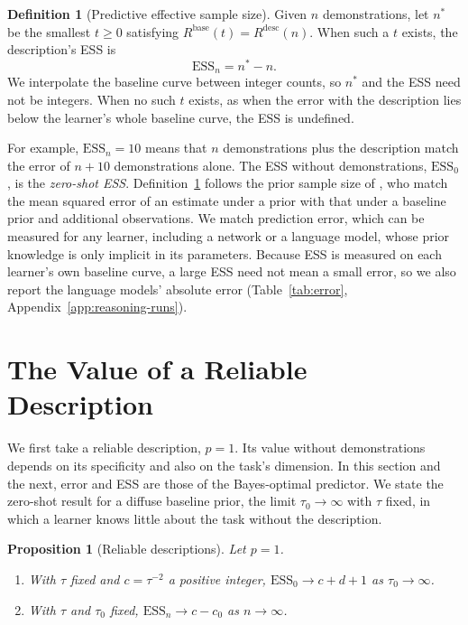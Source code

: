\documentclass{article}
\newtheorem{proposition}[theorem]{Proposition}
\theoremstyle{definition}
\newtheorem{definition}{Definition}
\newcommand{\ess}{\mathrm{ESS}}
\begin{document}
\begin{definition}[Predictive effective sample size]\label{def:ess}
Given $n$ demonstrations, let $n^*$ be the smallest $t\geq0$ satisfying $R^{\mathrm{base}}(t)=R^{\mathrm{desc}}(n)$. When such a $t$ exists, the description's ESS is
\[
\ess_n=n^*-n.
\]
We interpolate the baseline curve between integer counts, so $n^*$ and the ESS need not be integers. When no such $t$ exists, as when the error with the description lies below the learner's whole baseline curve, the ESS is undefined.
\end{definition}

For example, $\ess_n=10$ means that $n$ demonstrations plus the description match the error of $n+10$ demonstrations alone. The ESS without demonstrations, $\ess_0$, is the \emph{zero-shot ESS}.
Definition~\ref{def:ess} follows the prior sample size of \citet{reimherr2021}, who match the mean squared error of an estimate under a prior with that under a baseline prior and additional observations. We match prediction error, which can be measured for any learner, including a network or a language model, whose prior knowledge is only implicit in its parameters. Because ESS is measured on each learner's own baseline curve, a large ESS need not mean a small error, so we also report the language models' absolute error (Table~\ref{tab:error}, Appendix~\ref{app:reasoning-runs}).

\section{The Value of a Reliable Description}\label{sec:specificity}

We first take a reliable description, $p=1$. Its value without demonstrations depends on its specificity and also on the task's dimension. In this section and the next, error and ESS are those of the Bayes-optimal predictor. We state the zero-shot result for a diffuse baseline prior, the limit $\tau_0\to\infty$ with $\tau$ fixed, in which a learner knows little about the task without the description.

\begin{proposition}[Reliable descriptions]\label{prop:reliable}
Let $p=1$.
\begin{enumerate}[label=(\roman*),nosep,leftmargin=*]
\item With $\tau$ fixed and $c=\tau^{-2}$ a positive integer, $\ess_0\to c+d+1$ as $\tau_0\to\infty$.
\item With $\tau$ and $\tau_0$ fixed, $\ess_n\to c-c_0$ as $n\to\infty$.
\end{enumerate}
\end{proposition}
\end{document}
